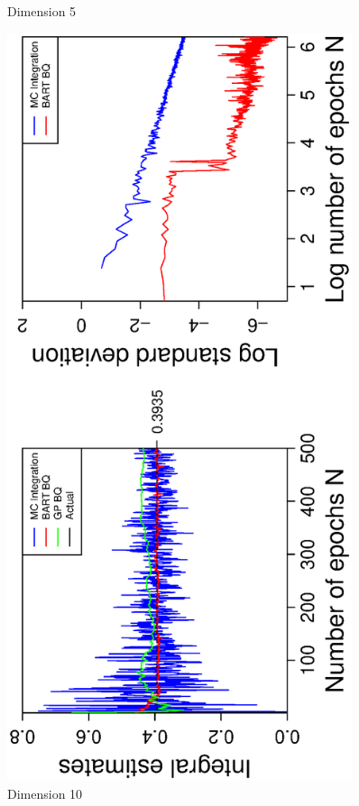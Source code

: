 \begin{figure}[H]
\begin{minipage}[b]{0.4\textwidth}
     \vspace{-1cm}
     \caption{Dimension 5}
  \end{minipage}
    \hspace{1.5cm}
  \begin{minipage}[b]{0.4\textwidth}
    \includegraphics[width= 0.9\textwidth, angle = -90]{report/Figures/3/convergenceMean310Dimensions.eps}
    \vspace{-1cm}
    \caption{Dimension 10}
  \end{minipage}
\end{figure}
\vspace{-1cm}

